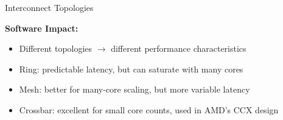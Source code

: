 \documentclass[aspectratio=169,12pt]{beamer}
\begin{document}
\begin{frame}{Interconnect Topologies}
\begin{center}
\begin{tikzpicture}[scale=0.65,
    cpu/.style={draw, circle, fill=blue!30, minimum size=0.8cm},
    mem/.style={draw, rectangle, fill=gray!30, minimum width=0.6cm, minimum height=0.4cm}
]
\end{tikzpicture}
\end{center}

\vspace{0.3cm}
\textbf{Software Impact:}
\begin{itemize}
\item Different topologies $\rightarrow$ different performance characteristics
\item Ring: predictable latency, but can saturate with many cores
\item Mesh: better for many-core scaling, but more variable latency
\item Crossbar: excellent for small core counts, used in AMD's CCX design
\end{itemize}
\end{frame}
\end{document}

